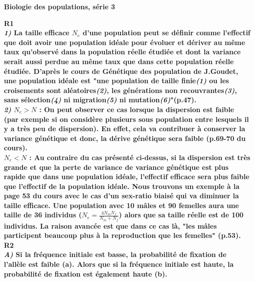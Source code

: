 \documentclass[a4paper]{report}
\renewcommand{\textbf}[1]{\begingroup\bfseries\mathversion{bold}#1\endgroup}
\begin{document}
\begin{center}
\textbf{Biologie des populations, série 3}
\end{center}

\textbf{R1}\\
\textit{1)} La taille efficace $N_e$ d'une population peut se définir comme l'effectif que doit avoir une population idéale pour évoluer et dériver au même taux qu'observé dans la population réelle étudiée et dont la variance serait aussi perdue au même taux que dans cette population réelle étudiée. D'après le cours de Génétique des population de J.Goudet, une population idéale est "une population de taille finie\textit{(1)} ou les croisements sont aléatoires\textit{(2)}, les générations non recouvrantes\textit{(3)}, sans sélection\textit{(4)} ni migration\textit{(5)} ni mutation\textit{(6)}"(p.47). \\

\textit{2)} 
$N_e>N$ : On peut observer ce cas lorsque la dispersion est faible (par exemple si on considère plusieurs sous population entre lesquels il y a très peu de dispersion). En effet, cela va contribuer à conserver la variance génétique et donc, la dérive génétique sera faible (p.69-70 du cours).\\

$N_e<N$ :  Au contraire du cas présenté ci-dessus, si la dispersion est très grande et que la perte de variance de variance génétique est plus rapide que dans une population idéale, l'effectif efficace sera plus faible que l'effectif de la population idéale. Nous trouvons un exemple à la page 53 du cours avec le cas d'un sex-ratio biaisé qui va diminuer la taille efficace. Une population avec 10 mâles et 90 femelles aura une taille de 36 individus ($N_e=\frac{4N_mN_f}{N_m+N_f}$) alors que sa taille réelle est de 100 individus. La raison avancée est que dans ce cas là, "les mâles participent beaucoup plus à la reproduction que les femelles" (p.53).\\

\textbf{R2}\\
\textit{A)} Si la fréquence initiale est basse, la probabilité de fixation de l'allèle est faible (a). Alors que si la fréquence initiale est haute, la probabilité de fixation est également haute (b). 
\end{document}
